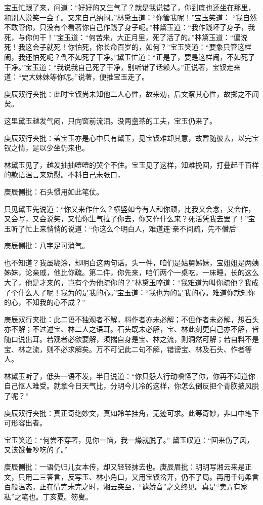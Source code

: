 \begin{parag}
    宝玉忙跟了来，问道：“好好的又生气了？就是我说错了，你到底也还坐在那里，和别人说笑一会子。又来自己纳闷。”林黛玉道：“你管我呢！”宝玉笑道： “我自然不敢管你，只没有个看著你自己作践了身子呢。”林黛玉道：“我作践坏了身子，我死，与你何干！”宝玉道：“何苦来，大正月里，死了活了的。”林黛玉道：“偏说死！我这会子就死！你怕死，你长命百岁的，如何？”宝玉笑道：“要象只管这样闹，我还怕死呢？倒不如死了干净。”黛玉忙道：“正是了，要是这样闹，不如死了干净。”宝玉道：“我说我自己死了干净，别听错了话赖人。”正说著，宝钗走来道：“史大妹妹等你呢。”说著，便推宝玉走了。\begin{note}庚辰双行夹批：此时宝钗尚未知他二人心性，故来劝，后文察其心性，故掷之不闻矣。\end{note}这里黛玉越发气闷，只向窗前流泪。没两盏茶的工夫，宝玉仍来了。\begin{note}庚辰双行夹批：盖宝玉亦是心中只有黛玉，见宝钗难却其意，故暂随彼去，以完宝钗之情，是以少坐仍来也。\end{note}林黛玉见了，越发抽抽噎噎的哭个不住。宝玉见了这样，知难挽回，打叠起千百样的款语温言来劝慰。不料自己未张口，\begin{note}庚辰侧批：石头惯用如此笔仗。\end{note}只见黛玉先说道：“你又来作什么？横竖如今有人和你顽，比我又会念，又会作，又会写，又会说笑，又怕你生气拉了你去，你又作什么来？死活凭我去罢了！”宝玉听了忙上来悄悄的说道：“你这么个明白人，难道连‘亲不间疏，先不僭后’\begin{note}庚辰侧批：八字足可消气。\end{note}也不知道？我虽糊涂，却明白这两句话。头一件，咱们是姑舅姊妹，宝姐姐是两姨姊妹，论亲戚，他比你疏。第二件，你先来，咱们两个一桌吃，一床睡，长的这么大了，他是才来的，岂有个为他疏你的？”林黛玉啐道：“我难道为叫你疏他？我成了个什么人了呢！我为的是我的心。”宝玉道：“我也为的是我的心。难道你就知你的心，不知我的心不成？”\begin{note}庚辰双行夹批：此二语不独观者不解，料作者亦未必解；不但作者未必解，想石头亦不解；不过述宝、林二人之语耳。石头既未必解，宝、林此刻更自己亦不解，皆随口说出耳。若观者必欲要解，须揣自身是宝、林之流，则洞然可解；若自料不是宝、林之流，则不必求解矣。万不可记此二句不解，错谤宝、林及石头、作者等人。\end{note}林黛玉听了，低头一语不发，半日说道：“你只怨人行动嗔怪了你，你再不知道你自己怄人难受。就拿今日天气比，分明今儿冷的这样，你怎么倒反把个青肷披风脱了呢？”\begin{note}庚辰双行夹批：真正奇绝妙文，真如羚羊挂角，无迹可求。此等奇妙，非口中笔下可形容出者。\end{note}宝玉笑道：“何尝不穿著，见你一恼，我一燥就脱了。” 黛玉叹道：“回来伤了风，又该饿著吵吃的了。”\begin{note}庚辰侧批：一语仍归儿女本传，却又轻轻抹去也。庚辰眉批：明明写湘云来是正文，只用二三答言，反写玉、林小角口，又用宝钗岔开，仍不了局。再用千句柔言百般温态，正在情完未完之时，湘云突至，“谑娇音”之文终见。真是“卖弄有家私”之笔也。丁亥夏。笏叟。\end{note}
\end{parag}


